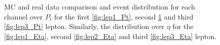 \begin{figure}[H]
{\begin{subfigure}{.525\textwidth}
        \caption{}
        \label{fig:lep2_Pt}
    \end{subfigure}
    }
    \caption{\ac{MC} and real data comparison and event distribution for each channel over $P_t$ for the first \ref{fig:lep1_Pt}, 
    second \ref{fig:lep2_Pt} and third \ref{fig:lep3_Pt} lepton. Similarly, the distribution over $\eta$
    for the \ref{fig:lep1_Eta}, second \ref{fig:lep2_Eta} and third \ref{fig:lep3_Eta} lepton.}
    \label{fig:Dist2}
\end{figure}
